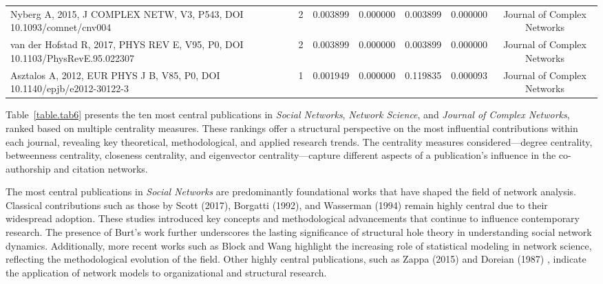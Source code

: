 \documentclass[twocolumn]{article}
\begin{document}
\begin{table}[htbp]
{\begin{tabular}{lcccccc}
					Nyberg A, 2015, J COMPLEX NETW, V3, P543, DOI 10.1093/comnet/cnv004 & 2 & 0.003899 & 0.000000 & 0.003899 & 0.000000 & Journal of Complex Networks \\
					van der Hofstad R, 2017, PHYS REV E, V95, P0, DOI 10.1103/PhysRevE.95.022307 & 2 & 0.003899 & 0.000000 & 0.003899 & 0.000000 & Journal of Complex Networks \\
					Asztalos A, 2012, EUR PHYS J B, V85, P0, DOI 10.1140/epjb/e2012-30122-3 & 1 & 0.001949 & 0.000000 & 0.119835 & 0.000093 & Journal of Complex Networks \\
					\bottomrule
				\end{tabular}
			}
		\end{table}
		
		Table~\ref{table.tab6} presents the ten most central publications in \textit{Social Networks}, \textit{Network Science}, and \textit{Journal of Complex Networks}, ranked based on multiple centrality measures. These rankings offer a structural perspective on the most influential contributions within each journal, revealing key theoretical, methodological, and applied research trends. The centrality measures considered—degree centrality, betweenness centrality, closeness centrality, and eigenvector centrality—capture different aspects of a publication’s influence in the co-authorship and citation networks.
		
		The most central publications in \textit{Social Networks} are predominantly foundational works that have shaped the field of network analysis. Classical contributions such as those by Scott (2017), Borgatti (1992), and Wasserman (1994) \cite{Scott2017,Borgatti1992,wasserman1994social} remain highly central due to their widespread adoption. These studies introduced key concepts and methodological advancements that continue to influence contemporary research. The presence of Burt's work \cite{Burt1983,Burt1992,Burt1992} further underscores the lasting significance of structural hole theory in understanding social network dynamics. Additionally, more recent works such as Block \cite{Block2015} and Wang \cite{Wang2013} highlight the increasing role of statistical modeling in network science, reflecting the methodological evolution of the field. Other highly central publications, such as Zappa (2015) \cite{Zappa2015} and Doreian (1987) \cite{Doreian1987}, indicate the application of network models to organizational and structural research.
		
\end{document}
